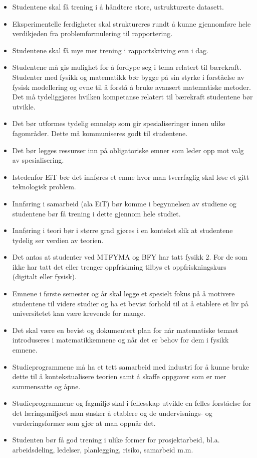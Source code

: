 \begin{itemize}
	\item Studentene skal få trening i å håndtere store, ustrukturerte datasett.
	\item Eksperimentelle ferdigheter skal struktureres rundt å kunne gjennomføre hele verdikjeden fra problemformulering til rapportering.
	\item Studentene skal få mye mer trening i rapportskriving enn i dag.
	\item Studentene må gis mulighet for å fordype seg i tema relatert til bærekraft. Studenter med fysikk og matematikk bør bygge på sin styrke i forståelse av fysisk modellering og evne til å forstå å bruke avansert matematiske metoder. Det må tydeliggjøres hvilken kompetanse relatert til bærekraft studentene bør utvikle.
	\item Det bør utformes tydelig emneløp som gir spesialiseringer innen ulike fagområder. Dette må kommuniseres godt til studentene.
	\item Det bør legges ressurser inn på obligatoriske emner som leder opp mot valg av spesialisering.
	\item Istedenfor EiT bør det innføres et emne hvor man tverrfaglig skal løse et gitt teknologisk problem.
	\item Innføring i samarbeid (ala EiT) bør komme i begynnelsen av studiene og studentene bør få trening i dette gjennom hele studiet.
	\item Innføring i teori bør i større grad gjøres i en kontekst slik at studentene tydelig ser verdien av teorien.
	\item Det antas at studenter ved MTFYMA og BFY har tatt fysikk 2. For de som ikke har tatt det eller trenger oppfriskning tilbys et oppfriskningskurs (digitalt eller fysisk).
	\item Emnene i første semester og år skal legge et spesielt fokus på å motivere studentene til videre studier og ha et bevist forhold til at å etablere et liv på universitetet kan være krevende for mange.
	\item Det skal være en bevist og dokumentert plan for når matematiske temaet introduseres i matematikkemnene og når det er behov for dem i fysikk emnene.
	\item Studieprogrammene må ha et tett samarbeid med industri for å kunne bruke dette til å kontekstualisere teorien samt å skaffe oppgaver som er mer sammensatte og åpne.
	\item Studieprogrammene og fagmiljø skal i fellesskap utvikle en felles forståelse for det læringsmiljøet man ønsker å etablere og de undervisnings- og vurderingsformer som gjør at man oppnår det.
	\item Studenten bør få god trening i ulike former for prosjektarbeid, bl.a. arbeidsdeling, ledelser, planlegging, risiko, samarbeid m.m.
\end{itemize}